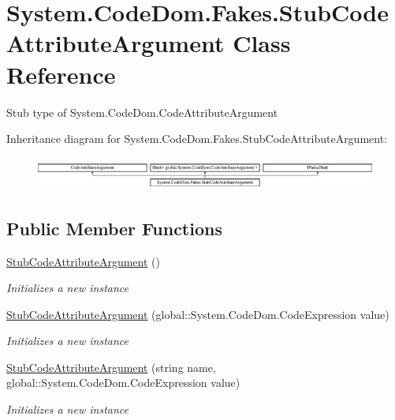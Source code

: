 \hypertarget{class_system_1_1_code_dom_1_1_fakes_1_1_stub_code_attribute_argument}{\section{System.\-Code\-Dom.\-Fakes.\-Stub\-Code\-Attribute\-Argument Class Reference}
\label{class_system_1_1_code_dom_1_1_fakes_1_1_stub_code_attribute_argument}
}


Stub type of System.\-Code\-Dom.\-Code\-Attribute\-Argument 


Inheritance diagram for System.\-Code\-Dom.\-Fakes.\-Stub\-Code\-Attribute\-Argument\-:\begin{figure}[H]
\begin{center}
\leavevmode
\includegraphics[height=1.085271cm]{class_system_1_1_code_dom_1_1_fakes_1_1_stub_code_attribute_argument}
\end{center}
\end{figure}
\subsection*{Public Member Functions}
\begin{DoxyCompactItemize}
\item 
\hyperlink{class_system_1_1_code_dom_1_1_fakes_1_1_stub_code_attribute_argument_a01347c0aad88bc8f5b91ac972ba410c4}{Stub\-Code\-Attribute\-Argument} ()
\begin{DoxyCompactList}\small\item\em Initializes a new instance\end{DoxyCompactList}\item 
\hyperlink{class_system_1_1_code_dom_1_1_fakes_1_1_stub_code_attribute_argument_a645f7e5ae6b7941eafd7cac77129e354}{Stub\-Code\-Attribute\-Argument} (global\-::\-System.\-Code\-Dom.\-Code\-Expression value)
\begin{DoxyCompactList}\small\item\em Initializes a new instance\end{DoxyCompactList}\item 
\hyperlink{class_system_1_1_code_dom_1_1_fakes_1_1_stub_code_attribute_argument_a5553194acdcea4a7ca1783b3f36d707c}{Stub\-Code\-Attribute\-Argument} (string name, global\-::\-System.\-Code\-Dom.\-Code\-Expression value)
\begin{DoxyCompactList}\small\item\em Initializes a new instance\end{DoxyCompactList}\end{DoxyCompactItemize}
